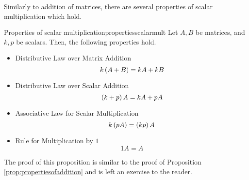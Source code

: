 Similarly to addition of matrices, there are several properties of scalar multiplication which hold.

\begin{proposition}{Properties of scalar multiplication}{propertiesscalarmult}
Let $A, B$ be matrices, and $k, p$ be scalars. Then, the following properties hold.
\begin{itemize}
\item Distributive Law over Matrix Addition
\begin{equation*}
k \left(A+B\right) =k A+ kB  
\end{equation*}

\item Distributive Law over Scalar Addition
\begin{equation*}
\left(k +p \right) A= k A+p A
\end{equation*}

\item Associative Law for Scalar Multiplication
\begin{equation*}
k \left(p A\right) = \left(k p \right) A 
\end{equation*}

\item Rule for Multiplication by $1$
\begin{equation*}
1A=A  
\end{equation*}
\end{itemize}

\end{proposition}

The proof of this proposition is similar to the proof of Proposition \ref{prop:propertiesofaddition} and is left an exercise to the reader.
